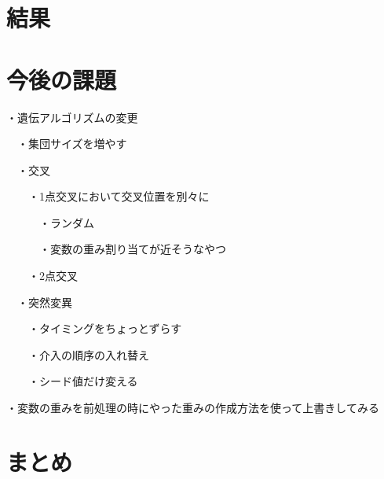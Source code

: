 \documentclass[titlepage]{jsarticle}
\begin{document}






















\section{結果}










\section{今後の課題}

・遺伝アルゴリズムの変更

　・集団サイズを増やす

　・交叉

　　・1点交叉において交叉位置を別々に

　　　・ランダム

　　　・変数の重み割り当てが近そうなやつ

　　・2点交叉

　・突然変異

　　・タイミングをちょっとずらす

　　・介入の順序の入れ替え

　　・シード値だけ変える

・変数の重みを前処理の時にやった重みの作成方法を使って上書きしてみる











\section{まとめ}
\end{document}
